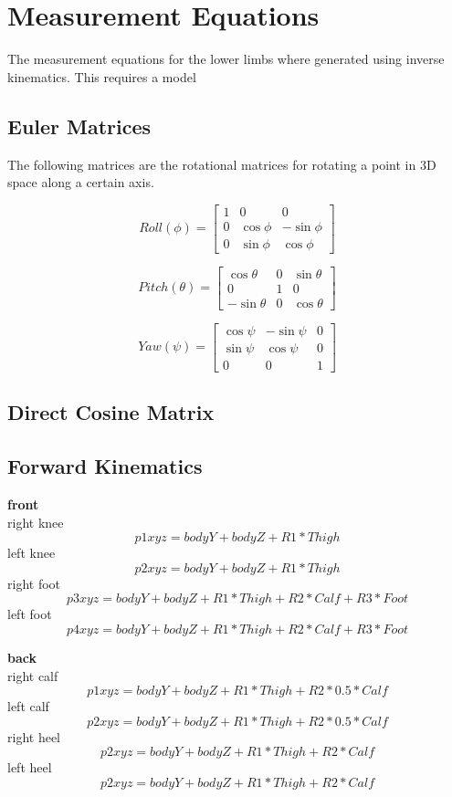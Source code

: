 \section{Measurement Equations}
The measurement equations for the lower limbs where generated using inverse kinematics. This requires a model

\subsection{Euler Matrices}
The following matrices are the rotational matrices for rotating a point in 3D space along a certain axis. 

$$
Roll(\phi) = 
\begin{bmatrix} 
1 & 0 & 0 \\ 
0 & \cos{\phi} & -\sin{\phi} \\ 
0 & \sin{\phi} & \cos{\phi}  
\end{bmatrix}
$$


$$
Pitch(\theta) = 
\begin{bmatrix} 
\cos{\theta} & 0 & \sin{\theta} \\ 
0 & 1 & 0 \\ 
-\sin{\theta} & 0 & \cos{\theta}  
\end{bmatrix}
$$


$$
Yaw(\psi) = 
\begin{bmatrix} 
\cos{\psi} & -\sin{\psi} & 0 \\ 
\sin{\psi} & \cos{\psi} & 0 \\ 
0 & 0 & 1  
\end{bmatrix}
$$


\subsection{Direct Cosine Matrix}


\subsection{Forward Kinematics}

\textbf{front}\\
right knee
$$ p1xyz = bodyY + bodyZ + R1 * Thigh $$
left knee
$$ p2xyz = bodyY + bodyZ + R1 * Thigh $$
right foot
$$ p3xyz = bodyY + bodyZ + R1 * Thigh + R2 * Calf + R3 * Foot $$
left foot
$$ p4xyz = bodyY + bodyZ + R1 * Thigh + R2 * Calf + R3 * Foot $$

\textbf{back}\\
right calf
$$ p1xyz = bodyY + bodyZ + R1 * Thigh + R2 * 0.5 * Calf $$
left calf
$$ p2xyz = bodyY + bodyZ + R1 * Thigh + R2 * 0.5 * Calf $$
right heel
$$ p2xyz = bodyY + bodyZ + R1 * Thigh + R2 * Calf $$
left heel
$$ p2xyz = bodyY + bodyZ + R1 * Thigh + R2 * Calf $$

